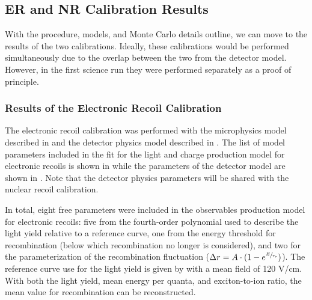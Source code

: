 


\subsection{ER and NR Calibration Results}
\label{sec:xe1t_er_nr_results}

With the procedure, models, and Monte Carlo details outline, we can move to the results of the two calibrations.  Ideally, these calibrations would be performed simultaneously due to the overlap between the two from the detector model.  However, in the first science run they were performed separately as a proof of principle.


\subsubsection{Results of the Electronic Recoil Calibration}
\label{sec:xe1t_er_cal_results}

The electronic recoil calibration was performed with the microphysics model described in  and the detector physics model described in .  The list of model parameters included in the fit for the light and charge production model for electronic recoils is shown in  while the parameters of the detector model are shown in .  Note that the detector physics parameters will be shared with the nuclear recoil calibration.

In total, eight free parameters were included in the observables production model for electronic recoils: five from the fourth-order polynomial used to describe the light yield relative to a reference curve, one from the energy threshold for recombination (below which recombination no longer is considered), and two for the parameterization of the recombination fluctuation ($\Delta r = A \cdot (1 - e^{\sfrac{E}{\tau_r}})$).  The reference curve use for the light yield is given by  with a mean field of 120 V/cm.  With both the light yield, mean energy per quanta, and exciton-to-ion ratio, the mean value for recombination can be reconstructed.  



